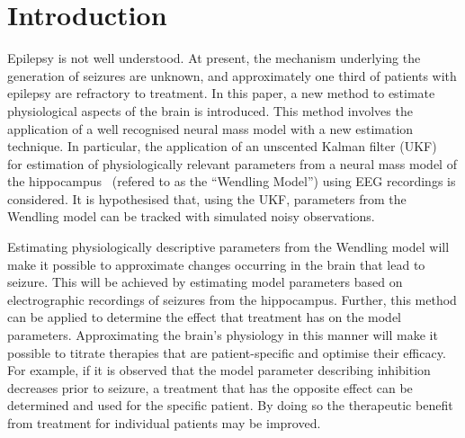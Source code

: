 \section{Introduction}


Epilepsy is not well understood. At present, the mechanism underlying the generation of seizures are unknown, and approximately one third of patients with epilepsy are refractory to treatment. In this paper, a new method to estimate physiological aspects of the brain is introduced. This method involves the application of a well recognised neural mass model with a new estimation technique. In particular, the application of an unscented Kalman filter (UKF)~\citep{voss2004nonlinear} for estimation of physiologically relevant parameters from a neural mass model of the hippocampus~\citep{wendling2002epileptic} (refered to as the ``Wendling Model'') using EEG recordings is considered. It is hypothesised that, using the UKF, parameters from the Wendling model can be tracked with simulated noisy observations.

Estimating physiologically descriptive parameters from the Wendling model will make it possible to approximate changes occurring in the brain that lead to seizure. This will be achieved by estimating model parameters based on electrographic recordings of seizures from the hippocampus. Further, this method can be applied to determine the effect that treatment has on the model parameters. Approximating the brain's physiology in this manner will make it possible to titrate therapies that are patient-specific and optimise their efficacy. For example, if it is observed that the model parameter describing inhibition decreases prior to seizure, a treatment that has the opposite effect can be determined and used for the specific patient. By doing so the therapeutic benefit from treatment for individual patients may be improved.


